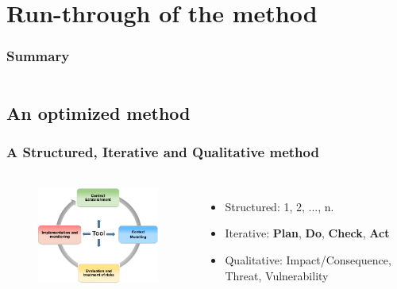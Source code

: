  
%
%
\section{Run-through of the method}
\begin{frame}
    \frametitle{Summary}
    \begin{columns}[t]
        \begin{column}{5cm}
            \tableofcontents[sections={1-3}, currentsection, hideothersubsections]
        \end{column}
        \begin{column}{5cm}
            \tableofcontents[sections={4-5}, currentsection, hideothersubsections]
        \end{column}
    \end{columns}
\end{frame}


\subsection{An optimized method}
\begin{frame}
    \frametitle{A Structured, Iterative and Qualitative method}
    \framesubtitle{}
    \begin{columns}[t]
        \column{6.0cm}
        \begin{figure}
        \includegraphics[width=6.0cm]{./images/MONARC-method-1.png}
        \end{figure}
        \column{6cm}
        \begin{itemize}
                \item Structured: 1, 2, ..., n.
                \item Iterative: \textbf{Plan}, \textbf{Do}, \textbf{Check}, \textbf{Act}
                \item Qualitative: Impact/Consequence, Threat, Vulnerability
        \end{itemize}
        \end{columns}
\end{frame}


